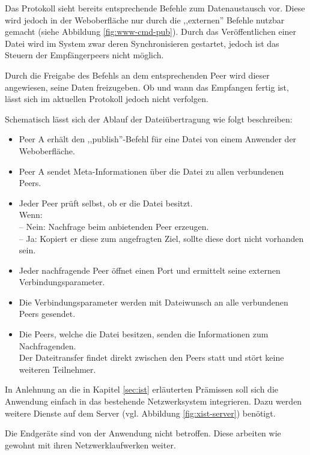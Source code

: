 \documentclass[oneside, ngerman, toc=bibliography,bibliography=totoc,listof=entryprefix, open=right,numbers=noenddot,fontsize=12pt]{scrbook}
\begin{document}
Das Protokoll sieht bereits entsprechende Befehle zum Datenaustausch vor. Diese wird jedoch in der Weboberfläche nur durch die ,,externen'' Befehle nutzbar gemacht (siehe Abbildung \ref{fig:www-cmd-pub}). Durch das Veröffentlichen einer Datei wird im System zwar deren Synchronisieren gestartet, jedoch ist das Steuern der Empfängerpeers nicht möglich.

Durch die Freigabe des Befehls an dem entsprechenden Peer wird dieser angewiesen, seine Daten freizugeben. Ob und wann das Empfangen fertig ist, lässt sich im aktuellen Protokoll jedoch nicht verfolgen. 

\bigskip
Schematisch lässt sich der Ablauf der Dateiübertragung wie folgt beschreiben:

\begin{itemize}
\item Peer A erhält den ,,publish''-Befehl für eine Datei von einem Anwender der Weboberfläche.
\item Peer A sendet Meta-Informationen über die Datei zu allen verbundenen Peers.
\item Jeder Peer prüft selbst, ob er die Datei besitzt.
\\ Wenn: \\
-- Nein: Nachfrage beim anbietenden Peer erzeugen.\\
-- Ja: Kopiert er diese zum angefragten Ziel, sollte diese dort nicht vorhanden sein.\\
\item Jeder nachfragende Peer öffnet einen Port und ermittelt seine externen Verbindungsparameter.
\item Die Verbindungsparameter werden mit Dateiwunsch an alle verbundenen Peers gesendet.
\item Die Peers, welche die Datei besitzen, senden die Informationen zum Nachfragenden.\\
Der Dateitransfer findet direkt zwischen den Peers statt und stört keine weiteren Teilnehmer.
\end{itemize}

In Anlehnung an die in Kapitel \ref{sec:ist} erläuterten Prämissen soll sich die Anwendung einfach in das bestehende Netzwerksystem integrieren. Dazu werden weitere Dienste auf dem Server (vgl. Abbildung \ref{fig:xist-server}) benötigt.
 
Die Endgeräte sind von der Anwendung nicht betroffen. Diese arbeiten wie gewohnt mit ihren Netzwerklaufwerken weiter.
 
\bigskip
 
\end{document}
